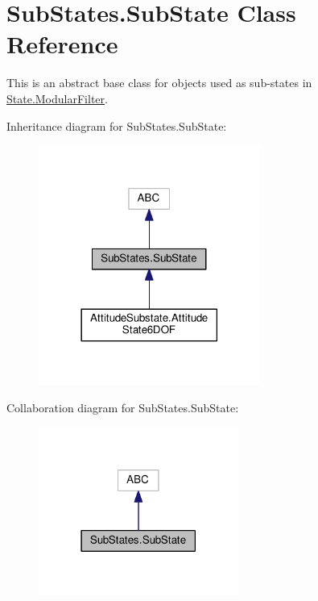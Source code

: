 \hypertarget{classSubStates_1_1SubState}{}\section{Sub\+States.\+Sub\+State Class Reference}
\label{classSubStates_1_1SubState}


This is an abstract base class for objects used as sub-\/states in \hyperlink{classState_1_1ModularFilter}{State.\+Modular\+Filter}.  




Inheritance diagram for Sub\+States.\+Sub\+State\+:
\nopagebreak
\begin{figure}[H]
\begin{center}
\leavevmode
\includegraphics[width=206pt]{classSubStates_1_1SubState__inherit__graph}
\end{center}
\end{figure}


Collaboration diagram for Sub\+States.\+Sub\+State\+:
\nopagebreak
\begin{figure}[H]
\begin{center}
\leavevmode
\includegraphics[width=186pt]{classSubStates_1_1SubState__coll__graph}
\end{center}
\end{figure}
